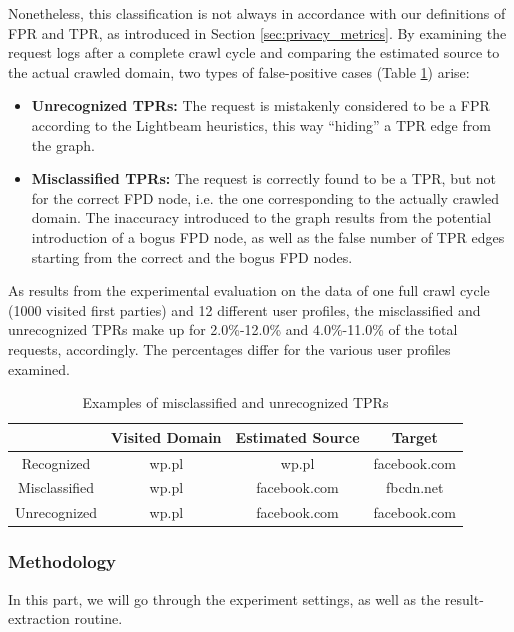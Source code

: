 \documentclass{sig-alternate}
\begin{document}
Nonetheless, this classification is not always in accordance with our definitions of FPR and TPR, as introduced in Section \ref{sec:privacy_metrics}. By examining the request logs after a complete crawl cycle and comparing the estimated source to the actual crawled domain, two types of false-positive cases (Table \ref{table:false_positive_examples}) arise:

\begin{itemize}
\item \textbf{Unrecognized TPRs:} The request is mistakenly considered to be a FPR according to the Lightbeam heuristics, this way ``hiding'' a TPR edge from the graph.
\item \textbf{Misclassified TPRs:} The request is correctly found to be a TPR, but not for the correct FPD node, i.e. the one corresponding to the actually crawled domain. The inaccuracy introduced to the graph results from the potential introduction of a bogus FPD node, as well as the false number of TPR edges starting from the correct and the bogus FPD nodes.
\end{itemize}

As results from the experimental evaluation on the data of one full crawl cycle (1000 visited first parties) and 12 different user profiles, the misclassified and unrecognized TPRs make up for 2.0\%-12.0\% and 4.0\%-11.0\% of the total requests, accordingly. The percentages differ for the various user profiles examined.

\begin{table}
\centering
\small
\begin{tabular}{|c|c c c|}
\hline
& Visited Domain & Estimated Source & Target \\
\hline
Recognized & wp.pl & wp.pl & facebook.com \\
Misclassified & wp.pl & facebook.com & fbcdn.net \\
Unrecognized & wp.pl & facebook.com & facebook.com \\
\hline
\end{tabular}
\caption{Examples of misclassified and unrecognized TPRs}
\label{table:false_positive_examples}
\end{table}

\subsubsection{Methodology}
{\color{blue}In this part, we will go through the experiment settings, as well as the result-extraction routine.}
\end{document}
